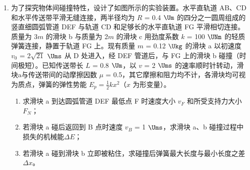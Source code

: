 \documentclass[\gkver]{gaokaozhenti}
\begin{document}
\begin{enumerate}
{（2）状态 A 时的压强 $p_{A} = p_{0} - \frac{{mg}}{S}$ = 1.0$\times$10$^{5}$ $\UPa$

温度 $T_{A}$ = 300 $\UK$；体积 $V_{A}$ = 600 $\Ucmc$；

C 态压强 $p_{C}$ = 1.4$\times$10$^{5}$ $\UPa$；温度 $T_{C}$ = ？；体积 $V_{C}$ = 500 $\Ucmc$；

根据 $\frac{{{p_{\mathrm{A}}}{V_{\mathrm{A}}}}}{{{T_{\mathrm{A}}}}} = \frac{{{p_{\mathrm{C}}}{V_{\mathrm{C}}}}}{{{T_{\mathrm{C}}}}}$

解得 $T_{C}$ = 350 $\UK$

（3）从 B 到 C 气体进行等容变化，则 $W_{BC}$ = 0，因从 B 到 C 气体内能增加 25 $\UJ$ 可知，气体从外界吸热 25 $\UJ$，而气体从 A 到 C 从外界吸热 14 $\UJ$，可知气体从 A 到 B 气体放热 11 $\UJ$，从 A 到 B 气体内能不变，可知从 A 到 B 外界对气体做功 11 $\UJ$。
}

\item
为了探究物体间碰撞特性，设计了如图所示的实验装置。水平直轨道 AB、CD 和水平传送带平滑无缝连接，两半径均为 $R$ = 0.4 $\Um$ 的四分之一圆周组成的竖直细圆弧管道 DEF 与轨道 CD 和足够长的水平直轨道 FG 平滑相切连接。质量为 3$m$ 的滑块 b 与质量为 2$m$ 的滑块 c 用劲度系数 $k$ = 100 $\UNm$ 的轻质弹簧连接，静置于轨道 FG 上。现有质量 $m$ = 0.12 $\Ukg$ 的滑块 a 以初速度 $v_{0}$ = 2$\sqrt {21} $ $\Ums$ 从 D 处进入，经 DEF 管道后，与 FG 上的滑块 b 碰撞（时间极短）。已知传送带长 $L$ = 0.8 $\Um$，以 $v$ = 2 $\Ums$ 的速率顺时针转动，滑块a与传送带间的动摩擦因数 $\mu$ = 0.5，其它摩擦和阻力均不计，各滑块均可视为质点，弹簧的弹性势能 $E_{p} = \frac{1}{2}kx^{2}$（$x$ 为形变量）。
\begin{enumerate}
	\item
	求滑块 a 到达圆弧管道 DEF 最低点 F 时速度大小 $v_{F}$ 和所受支持力大小 $F_{N}$；
	\item
	若滑块 a 碰后返回到 B 点时速度 $v_{B}$ = 1 $\Ums$，求滑块 a、b 碰撞过程中损失的机械能$\Delta E$；
	\item
	若滑块 a 碰到滑块 b 立即被粘住，求碰撞后弹簧最大长度与最小长度之差 $\Delta x$。
\end{enumerate}
\end{enumerate}
\end{document}
